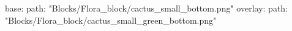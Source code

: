 base:
  path: "Blocks/Flora_block/cactus_small_bottom.png"
overlay:
  path: "Blocks/Flora_block/cactus_small_green_bottom.png"